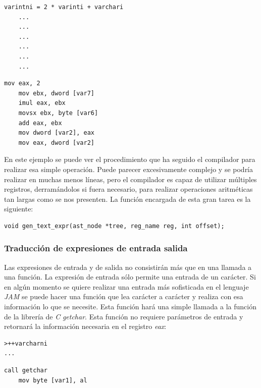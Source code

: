 \documentclass[a4paper,10pt]{article}
\begin{document}
\begin{multicols}{2}
\begin{lstlisting}[language=jam,frame=single]
	varintni = 2 * varinti + varchari
	...
	...
	...
	...
	...
	...
\end{lstlisting}
\begin{lstlisting}[frame=single]
	mov eax, 2
	mov ebx, dword [var7]
	imul eax, ebx
	movsx ebx, byte [var6]
	add eax, ebx
	mov dword [var2], eax
	mov eax, dword [var2]
\end{lstlisting}
\end{multicols}
En este ejemplo se puede ver el procedimiento que ha seguido el compilador para realizar esa simple operación. Puede parecer excesivamente complejo y se podría realizar en muchas menos líneas, pero el compilador es capaz de utilizar múltiples registros, derramándolos si fuera necesario, para realizar operaciones aritméticas tan largas como se nos presenten. La función encargada de esta gran tarea es la siguiente:

\begin{lstlisting}
void gen_text_expr(ast_node *tree, reg_name reg, int offset);
\end{lstlisting}
\subsubsection{Traducción de expresiones de entrada salida}

Las expresiones de entrada y de salida no consistirán más que en una llamada a una función. La expresión de entrada sólo permite una entrada de un carácter. Si en algún momento se quiere realizar una entrada más sofisticada en el lenguaje \textit{JAM} se puede hacer una función que lea carácter a carácter y realiza con esa información lo que se necesite. Esta función hará una simple llamada a la función de la librería de \textit{C} \textit{getchar}. Esta función no requiere parámetros de entrada y retornará la información necesaria en el registro \textit{eax}:
\begin{multicols}{2}
\begin{lstlisting}[language=jam,frame=single]
>++varcharni
...
\end{lstlisting}
\begin{lstlisting}[frame=single]
	call getchar
	mov byte [var1], al
\end{lstlisting}
\end{multicols}
\end{document}
